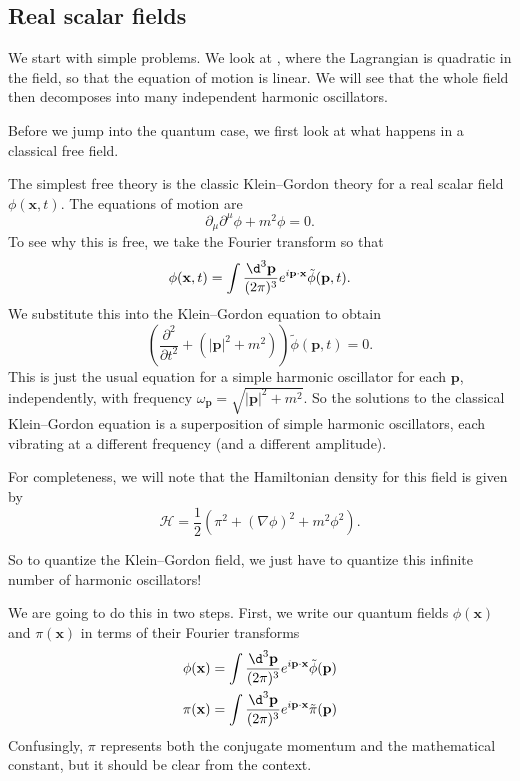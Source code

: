 \documentclass[a4paper]{article}
\begin{document}
\subsection{Real scalar fields}
We start with simple problems. We look at , where the Lagrangian is quadratic in the field, so that the equation of motion is linear. We will see that the whole field then decomposes into many independent harmonic oscillators.

Before we jump into the quantum case, we first look at what happens in a classical free field.
\begin{eg}
  The simplest free theory is the classic Klein--Gordon theory for a real scalar field $\phi(\mathbf{x}, t)$. The equations of motion are
  \[
    \partial_\mu \partial^\mu \phi + m^2 \phi = 0.
  \]
  To see why this is free, we take the Fourier transform so that
  \[
    \phi(\mathbf{x}, t) = \int \frac{\d^3 \mathbf{p}}{(2\pi)^3} e^{i \mathbf{p}\cdot \mathbf{x}} \tilde{\phi}(\mathbf{p}, t).
  \]
  We substitute this into the Klein--Gordon equation to obtain
  \[
    \left(\frac{\partial^2}{\partial t^2} + (|\mathbf{p}|^2 + m^2)\right)\tilde{\phi}(\mathbf{p}, t) = 0.
  \]
  This is just the usual equation for a simple harmonic oscillator for each $\mathbf{p}$, independently, with frequency $\omega_\mathbf{p} = \sqrt{|\mathbf{p}|^2 + m^2}$. So the solutions to the classical Klein--Gordon equation is a superposition of simple harmonic oscillators, each vibrating at a different frequency (and a different amplitude).

  For completeness, we will note that the Hamiltonian density for this field is given by
  \[
    \mathcal{H} = \frac{1}{2}(\pi^2 + (\nabla \phi)^2 + m^2 \phi^2).
  \]
\end{eg}
So to quantize the Klein--Gordon field, we just have to quantize this infinite number of harmonic oscillators!

We are going to do this in two steps. First, we write our quantum fields $\phi(\mathbf{x})$ and $\pi(\mathbf{x})$ in terms of their Fourier transforms
\begin{align*}
  \phi(\mathbf{x}) &= \int \frac{\d^3 \mathbf{p}}{(2\pi)^3} e^{i\mathbf{p}\cdot \mathbf{x}} \tilde{\phi}(\mathbf{p})\\
  \pi(\mathbf{x}) &= \int \frac{\d^3 \mathbf{p}}{(2\pi)^3} e^{i\mathbf{p}\cdot \mathbf{x}} \tilde{\pi}(\mathbf{p})
\end{align*}
Confusingly, $\pi$ represents both the conjugate momentum and the mathematical constant, but it should be clear from the context.
\end{document}
